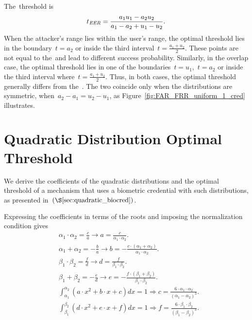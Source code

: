 \documentclass[conference,compsoc]{IEEEtran}
\begin{document}
The~\EER threshold is
\begin{equation*}
t_{\textit{EER}} = \frac{a_1 u_1 - a_2 u_2}{a_1 - a_2 + u_1 - u_2}.
\end{equation*}
When the attacker's range lies within the user's range, the optimal threshold lies in the boundary~${t = a_2}$ or inside the third interval~$t=\frac{a_1 + u_2}{2}$. These points are not equal to the~\EER and lead to different success probability. Similarly, in the overlap case, the optimal threshold lies in one of the boundaries~${t = u_1}$,~${t = a_2}$ or inside the third interval where~$t=\frac{a_1 + u_2}{2}$. Thus, in both cases, the optimal threshold generally differs from the~\EER. The two coincide only when the distributions are symmetric, when~${a_2 - a_1 = u_2 - u_1}$, as Figure~\ref{fig:FAR_FRR_uniform_1_cred} illustrates.

\section{Quadratic Distribution Optimal Threshold}\label{app:quad_opt_thr}
\noindent
We derive the coefficients of the quadratic distributions and the optimal threshold of a mechanism that uses a biometric credential with such distributions, as presented in~$(\S\ref{sec:quadratic_biocred})$.

Expressing the coefficients in terms of the roots and imposing the normalization condition gives
\begin{align*}
    &\alpha_1 \cdot \alpha_2 = \frac{c}{a} \rightarrow a = \frac{c}{\alpha_1 \cdot \alpha_2}. \\
    &\alpha_1 + \alpha_2 = -\frac{b}{a} \rightarrow b = - \frac{c \cdot (\alpha_1 + \alpha_2)}{\alpha_1 \cdot \alpha_2}. \\
    &\beta_1 \cdot \beta_2 = \frac{f}{d} \rightarrow d = \frac{f}{\beta_1 \cdot \beta_2}. \\
    &\beta_1 + \beta_2 = -\frac{e}{d} \rightarrow e = - \frac{f \cdot (\beta_1 + \beta_2)}{\beta_1 \cdot \beta_2}. \\
    &\int_{\alpha_1}^{\alpha_2} (a \cdot x^2+b \cdot x+c) dx = 1 \Rightarrow c = \frac{6 \cdot \alpha_1 \cdot \alpha_2}{(\alpha_1 - \alpha_2)^3}. \\
    &\int_{\beta_1}^{\beta_2} (d \cdot x^2+e \cdot x+f) dx = 1 \Rightarrow f = \frac{6 \cdot \beta_1 \cdot \beta_2}{(\beta_1 - \beta_2)^3}.
\end{align*}
\end{document}
